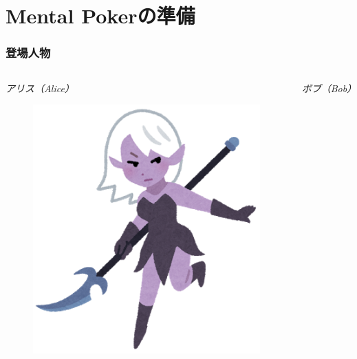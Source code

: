 \section{Mental Pokerの準備}

\begin{frame}
  \frametitle{登場人物}

  \begin{columns}
    \begin{column}{0.48\textwidth}
      \emph{アリス（Alice）}

      \begin{figure}[h]
        \includegraphics[height=0.5\textheight]{img/alice.png}
      \end{figure}
    \end{column}
   
    \begin{column}{0.48\textwidth}
      \emph{ボブ（Bob）}


\end{column}
\end{columns}
\end{frame}
